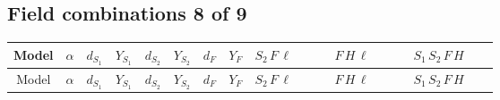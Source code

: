 \documentclass[8pt]{article}
\begin{document}
\begin{landscape}
\begin{longtable}{@{}cccccccc >{\raggedright\arraybackslash}p{0.21\linewidth} >{\raggedright\arraybackslash}p{0.21\linewidth} >{\raggedright\arraybackslash}p{0.21\linewidth}@{}}
\midrule
\bottomrule
\end{longtable}
\clearpage
\subsection*{Field combinations 8 of 9}
\begin{longtable}{@{}cccccccc >{\raggedright\arraybackslash}p{0.21\linewidth} >{\raggedright\arraybackslash}p{0.21\linewidth} >{\raggedright\arraybackslash}p{0.21\linewidth}@{}}
\toprule
Model & $\alpha$ & $d_{S_1}$ & $Y_{S_1}$ & $d_{S_2}$ & $Y_{S_2}$ & $d_F$ & $Y_F$ & $S_2\,F\,\ell$ & $F\,H\,\ell$ & $S_1\,S_2\,F\,H$ \\
\midrule
\endfirsthead
\toprule
Model & $\alpha$ & $d_{S_1}$ & $Y_{S_1}$ & $d_{S_2}$ & $Y_{S_2}$ & $d_F$ & $Y_F$ & $S_2\,F\,\ell$ & $F\,H\,\ell$ & $S_1\,S_2\,F\,H$ \\
\midrule
\endhead

\end{longtable}
\end{landscape}
\end{document}
